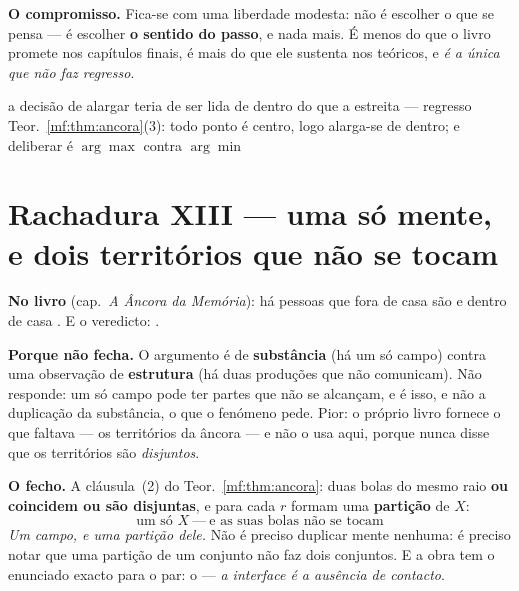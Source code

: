 \documentclass[../livro.tex]{subfiles}
\begin{document}
\medskip\noindent\textbf{O compromisso.} Fica-se com uma liberdade modesta: não é
escolher o que se pensa --- é escolher \textbf{o sentido do passo}, e nada mais.
É menos do que o livro promete nos capítulos finais, é mais do que ele sustenta
nos teóricos, e \emph{é a única que não faz regresso}.

      {a decisão de alargar teria de ser lida de dentro do que a estreita ---
       regresso}
      {Teor.~\ref{mf:thm:ancora}(3): todo ponto é centro, logo alarga-se de
       dentro; e deliberar é $\arg\max$ contra $\arg\min$}

\section{Rachadura XIII --- uma só mente, e dois territórios que não se tocam}\label{mf:r13}

\noindent\textbf{No livro} (cap.~\emph{A Âncora da Memória}): há pessoas que fora
de casa são  e dentro de casa . E o
veredicto: .

\medskip\noindent\textbf{Porque não fecha.} O argumento é de \textbf{substância}
(há um só campo) contra uma observação de \textbf{estrutura} (há duas produções
que não comunicam). Não responde: um só campo pode ter partes que não se
alcançam, e é isso, e não a duplicação da substância, o que o fenómeno pede.
Pior: o próprio livro fornece o que faltava --- os territórios da âncora --- e
não o usa aqui, porque nunca disse que os territórios são \emph{disjuntos}.

\medskip\noindent\textbf{O fecho.} A cláusula~(2) do Teor.~\ref{mf:thm:ancora}:
duas bolas do mesmo raio \textbf{ou coincidem ou são disjuntas}, e para cada $r$
formam uma \textbf{partição} de $X$:
\[
\boxed{\;\text{um só } X\ \text{---}\ \text{e as suas bolas não se tocam}\;}
\]
\emph{Um campo, e uma partição dele.} Não é preciso duplicar mente nenhuma: é
preciso notar que uma partição de um conjunto não faz dois conjuntos. E a obra
tem o enunciado exacto para o par: o
--- \emph{a interface é a ausência de contacto}.
\end{document}
